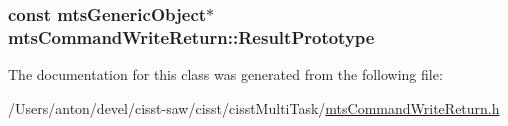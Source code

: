 \subsubsection[{Result\+Prototype}]{\setlength{\rightskip}{0pt plus 5cm}const {\bf mts\+Generic\+Object}$\ast$ mts\+Command\+Write\+Return\+::\+Result\+Prototype\hspace{0.3cm}{\ttfamily [protected]}}\label{classmts_command_write_return_a02ec49cd66e7d95bd1ac9d08e5eb8cae}


The documentation for this class was generated from the following file\+:\begin{DoxyCompactItemize}
\item 
/\+Users/anton/devel/cisst-\/saw/cisst/cisst\+Multi\+Task/\hyperlink{mts_command_write_return_8h}{mts\+Command\+Write\+Return.\+h}\end{DoxyCompactItemize}
